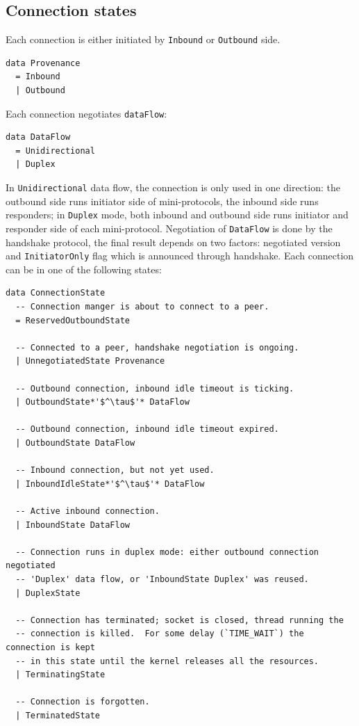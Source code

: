 \subsection{Connection states}\label{sec:connection-state}

Each connection is either initiated by \texttt{Inbound} or \texttt{Outbound} side.

\begin{lstlisting}
data Provenance
  = Inbound
  | Outbound
\end{lstlisting}
Each connection negotiates \texttt{dataFlow}:
\begin{lstlisting}
data DataFlow
  = Unidirectional
  | Duplex
\end{lstlisting}

In \texttt{Unidirectional} data flow, the connection is only used in one direction:
the outbound side runs initiator side of mini-protocols, the inbound side runs
responders; in \texttt{Duplex} mode, both inbound and outbound side runs
initiator and responder side of each mini-protocol. Negotiation of
\texttt{DataFlow} is done by the handshake protocol, the final result depends
on two factors: negotiated version and \texttt{InitiatorOnly} flag which is
announced through handshake. Each connection can be in one of the following
states:

\begin{lstlisting}
data ConnectionState
  -- Connection manger is about to connect to a peer.
  = ReservedOutboundState

  -- Connected to a peer, handshake negotiation is ongoing.
  | UnnegotiatedState Provenance

  -- Outbound connection, inbound idle timeout is ticking.
  | OutboundState*'$^\tau$'* DataFlow

  -- Outbound connection, inbound idle timeout expired.
  | OutboundState DataFlow

  -- Inbound connection, but not yet used.
  | InboundIdleState*'$^\tau$'* DataFlow

  -- Active inbound connection.
  | InboundState DataFlow

  -- Connection runs in duplex mode: either outbound connection negotiated
  -- 'Duplex' data flow, or 'InboundState Duplex' was reused.
  | DuplexState

  -- Connection has terminated; socket is closed, thread running the
  -- connection is killed.  For some delay (`TIME_WAIT`) the connection is kept
  -- in this state until the kernel releases all the resources.
  | TerminatingState

  -- Connection is forgotten.
  | TerminatedState
\end{lstlisting}

